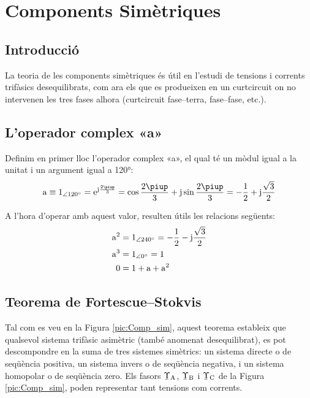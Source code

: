 \chapter{Components Simètriques}  \label{sec:comp-sim}

\section{Introducció}
La teoria de les components simètriques és útil en l'estudi de
tensions i corrents trifàsics
 desequilibrats, com ara els que es produeixen en un curtcircuit on no intervenen les tres
 fases alhora (curtcircuit fase--terra, fase--fase, etc.).

\section{L'operador complex «a»}

Definim en primer lloc l'operador complex «a», el qual té un mòdul
igual a la unitat i un argument igual a \ang{120}: 
\begin{equation}
   \au \equiv \numpd{1}{120} = \eu^{\ju\frac{2\piup}{3}} =
   \cos \frac{2\piup}{3} + \ju \sin \frac{2\piup}{3} = - \frac{1}{2} + \ju \frac{\sqrt{3}}{2}
\end{equation}

A l'hora d'operar amb aquest valor, resulten útils les relacions
següents:
\begin{subequations}
\begin{align}
    \mathrm{a}^2 &= \num{1}_{\angle\ang{240}}= - \frac{1}{2} - \mathrm{j} \frac{\sqrt{3}}{2} \\
    \mathrm{a}^3 &= \num{1}_{\angle\ang{0}} = 1 \\
    0 &= 1+ \mathrm{a} + \mathrm{a}^2
 \end{align}
\end{subequations}

\section{\texorpdfstring{Teorema de Fortescue--Stokvis}{Teorema de Fortescue-Stokvis}}

Tal com es veu en la Figura \vref{pic:Comp_sim}, aquest teorema
estableix que qualsevol sistema trifàsic asimètric (també anomenat
desequilibrat),  es pot descompondre  en la suma de tres sistemes
simètrics: un sistema directe o de seqüència positiva, un sistema
invers o de seqüència negativa, i un sistema homopolar o de
seqüència zero. Els fasors $\cmplx{\Upsilon}\ped{A}$,
$\cmplx{\Upsilon}\ped{B}$ i $\cmplx{\Upsilon}\ped{C}$ de la Figura \vref{pic:Comp_sim}, poden representar tant
tensions com corrents.

